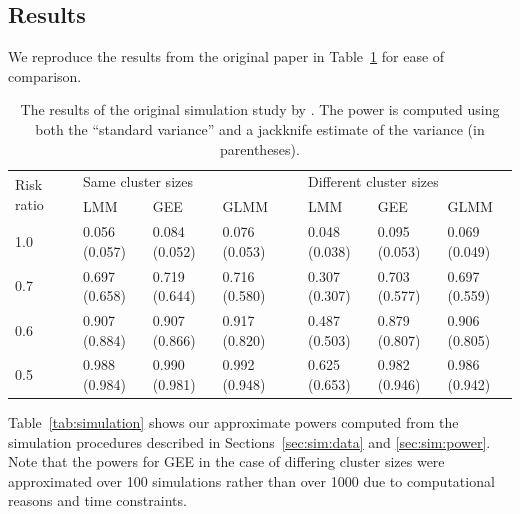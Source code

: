 \documentclass[10pt]{article}
\begin{document}
\subsection{Results}

We reproduce the results from the original paper in Table~\ref{tab:original} for ease of comparison.

\begin{table}[H]
\centering
\begin{tabular}{@{}lclllclll@{}}
\toprule
\multirow{2}{*}{\parbox{0.75cm}{Risk ratio}} && \multicolumn{3}{l}{Same cluster sizes} && \multicolumn{3}{l}{Different cluster sizes} \\
\cmidrule{3-5}\cmidrule{7-9}
 & & LMM & GEE & GLMM && LMM & GEE & GLMM \\
\midrule
1.0 &&  0.056 (0.057) & 0.084 (0.052) & 0.076 (0.053) && 0.048 (0.038) & 0.095 (0.053) & 0.069 (0.049) \\
0.7 && 0.697 (0.658) & 0.719 (0.644) & 0.716 (0.580) && 0.307 (0.307) & 0.703 (0.577) & 0.697 (0.559) \\
0.6 && 0.907 (0.884) & 0.907 (0.866) & 0.917 (0.820) && 0.487 (0.503) & 0.879 (0.807) & 0.906 (0.805) \\
0.5 && 0.988 (0.984) & 0.990 (0.981) & 0.992 (0.948) && 0.625 (0.653) & 0.982 (0.946) & 0.986 (0.942) \\
\bottomrule
\end{tabular}
\caption{The results of the original simulation study by \textcite{Hussey:2007}. The power is computed using both the ``standard variance'' and a jackknife estimate of the variance (in parentheses).}
\label{tab:original}
\end{table}

Table~\ref{tab:simulation} shows our approximate powers computed from the simulation procedures described in Sections~\ref{sec:sim:data} and \ref{sec:sim:power}. Note that the powers for GEE in the case of differing cluster sizes were approximated over 100 simulations rather than over 1000 due to computational reasons and time constraints.
\end{document}
